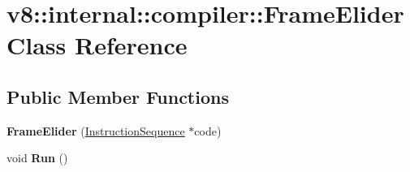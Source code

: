 \hypertarget{classv8_1_1internal_1_1compiler_1_1_frame_elider}{}\section{v8\+:\+:internal\+:\+:compiler\+:\+:Frame\+Elider Class Reference}
\label{classv8_1_1internal_1_1compiler_1_1_frame_elider}
\subsection*{Public Member Functions}
\begin{DoxyCompactItemize}
\item 
{\bfseries Frame\+Elider} (\hyperlink{classv8_1_1internal_1_1compiler_1_1_instruction_sequence}{Instruction\+Sequence} $\ast$code)\hypertarget{classv8_1_1internal_1_1compiler_1_1_frame_elider_a33cd828ec6aafd685b955e1cf6670d43}{}\label{classv8_1_1internal_1_1compiler_1_1_frame_elider_a33cd828ec6aafd685b955e1cf6670d43}

\item 
void {\bfseries Run} ()\hypertarget{classv8_1_1internal_1_1compiler_1_1_frame_elider_af6de175cbbb0bd8c3f5d16a6745b133b}{}\label{classv8_1_1internal_1_1compiler_1_1_frame_elider_af6de175cbbb0bd8c3f5d16a6745b133b}

\end{DoxyCompactItemize}

